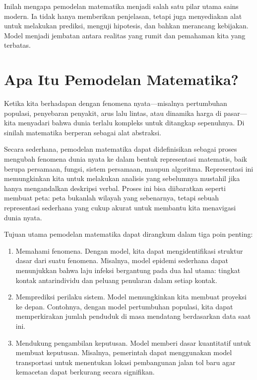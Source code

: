 \documentclass{bukumjh}
\begin{document}
Inilah mengapa pemodelan matematika menjadi salah satu pilar utama sains modern. Ia tidak hanya memberikan penjelasan, tetapi juga menyediakan alat untuk melakukan prediksi, menguji hipotesis, dan bahkan merancang kebijakan. Model menjadi jembatan antara realitas yang rumit dan pemahaman kita yang terbatas.

\section{Apa Itu Pemodelan Matematika?}

Ketika kita berhadapan dengan fenomena nyata—misalnya pertumbuhan populasi, penyebaran penyakit, arus lalu lintas, atau dinamika harga di pasar—kita menyadari bahwa dunia terlalu kompleks untuk ditangkap sepenuhnya. Di sinilah matematika berperan sebagai alat abstraksi. 

Secara sederhana, {\jsg pemodelan matematika} dapat didefinisikan sebagai proses mengubah fenomena dunia nyata ke dalam bentuk representasi matematis, baik berupa persamaan, fungsi, sistem persamaan, maupun algoritma. Representasi ini memungkinkan kita untuk melakukan analisis yang sebelumnya mustahil jika hanya mengandalkan deskripsi verbal. Proses ini bisa diibaratkan seperti membuat peta: peta bukanlah wilayah yang sebenarnya, tetapi sebuah representasi sederhana yang cukup akurat untuk membantu kita menavigasi dunia nyata.

Tujuan utama pemodelan matematika dapat dirangkum dalam tiga poin penting:
\begin{enumerate}
    \item {\jsg Memahami fenomena.} Dengan model, kita dapat mengidentifikasi struktur dasar dari suatu fenomena. Misalnya, model epidemi sederhana dapat menunjukkan bahwa laju infeksi bergantung pada dua hal utama: tingkat kontak antarindividu dan peluang penularan dalam setiap kontak.
    \item {\jsg Memprediksi perilaku sistem.} Model memungkinkan kita membuat proyeksi ke depan. Contohnya, dengan model pertumbuhan populasi, kita dapat memperkirakan jumlah penduduk di masa mendatang berdasarkan data saat ini.
    \item {\jsg Mendukung pengambilan keputusan.} Model memberi dasar kuantitatif untuk membuat keputusan. Misalnya, pemerintah dapat menggunakan model transportasi untuk menentukan lokasi pembangunan jalan tol baru agar kemacetan dapat berkurang secara signifikan.
\end{enumerate}
\end{document}
